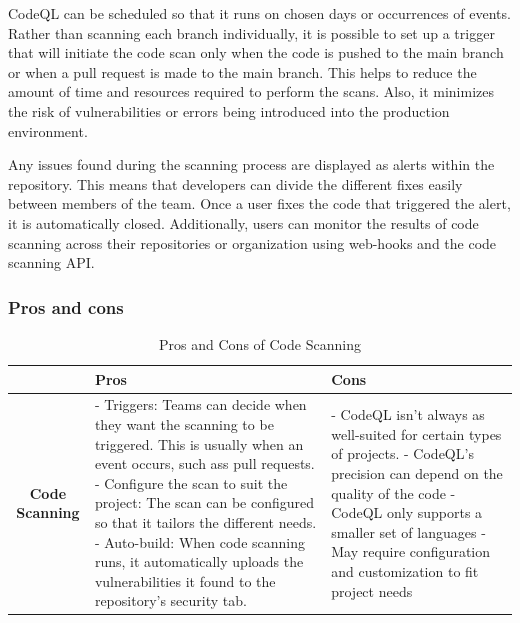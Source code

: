 CodeQL can be scheduled so that it runs on chosen days or occurrences of events. Rather than scanning each branch individually, it is possible to set up a trigger that will initiate the code scan only when the code is pushed to the main branch or when a pull request is made to the main branch. This helps to reduce the amount of time and resources required to perform the scans. Also, it minimizes the risk of vulnerabilities or errors being introduced into the production environment.

Any issues found during the scanning process are displayed as alerts within the repository. This means that developers can divide the different fixes easily between members of the team.  Once a user fixes the code that triggered the alert, it is automatically closed. Additionally, users can monitor the results of code scanning across their repositories or organization using web-hooks and the code scanning API. 
\cite{GithubCodeScanning}

\subsubsection{Pros and cons}
\begin{table}[H]
\centering
\begin{tabular}{|c|p{6cm}|p{6cm}|}
\hline
 & \textbf{Pros} & \textbf{Cons} \\
\hline
\textbf{Code Scanning} & 
- Triggers: Teams can decide when they want the scanning to be triggered. This is usually when an event occurs, such ass pull requests.  \newline
- Configure the scan to suit the project: The scan can be configured so that it tailors the 
  different needs. \newline
- Auto-build: When code scanning runs, it automatically uploads the vulnerabilities it found to the repository's security tab. &
- CodeQL isn't always as well-suited for certain types of projects. \newline
- CodeQL's precision can depend on the quality of the code\newline
- CodeQL only supports a smaller set of languages \newline
- May require configuration and customization to fit project needs \\
\hline
\end{tabular}
\caption{Pros and Cons of Code Scanning}
\label{tab: Code Scanning}
\end{table}


